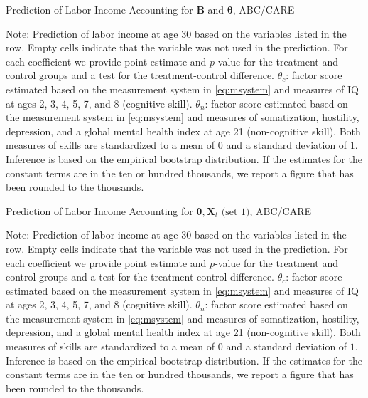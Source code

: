 \begin{table} 
\begin{threeparttable}
\caption{Prediction of Labor Income Accounting for $\bm{B}$ and $\bm{\theta}$, ABC/CARE}
\label{table:predfac1}
\centering 
\footnotesize

\begin{tablenotes}
\footnotesize
\item Note: Prediction of labor income at age 30 based on the variables listed in the row. Empty cells indicate that the variable was not used in the prediction. For each coefficient we provide point estimate and $p$-value for the treatment and control groups and a test for the treatment-control difference. $\theta_{c}$: factor score estimated based on the measurement system in \eqref{eq:msystem} and measures of IQ at ages 2, 3, 4, 5, 7, and 8 (cognitive skill). $\theta_{n}$: factor score estimated based on the measurement system in \eqref{eq:msystem} and measures of somatization, hostility, depression, and a global mental health index at age 21 (non-cognitive skill). Both measures of skills are standardized to a mean of $0$ and a standard deviation of $1$. Inference is based on the empirical bootstrap distribution. If the estimates for the constant terms are in the ten or hundred thousands, we report a figure that has been rounded to the thousands.
\end{tablenotes}
\end{threeparttable}
\end{table}

\begin{table} 
\begin{threeparttable}
\caption{Prediction of Labor Income Accounting for $\bm{\theta}, \bm{X}_{t} \text{ (set 1)}$, ABC/CARE}
\label{table:predfac2}
\centering 
\footnotesize

\begin{tablenotes}
\footnotesize
\item Note: Prediction of labor income at age 30 based on the variables listed in the row. Empty cells indicate that the variable was not used in the prediction. For each coefficient we provide point estimate and $p$-value for the treatment and control groups and a test for the treatment-control difference. $\theta_{c}$: factor score estimated based on the measurement system in \eqref{eq:msystem} and measures of IQ at ages 2, 3, 4, 5, 7, and 8 (cognitive skill). $\theta_{n}$: factor score estimated based on the measurement system in \eqref{eq:msystem} and measures of somatization, hostility, depression, and a global mental health index at age 21 (non-cognitive skill). Both measures of skills are standardized to a mean of $0$ and a standard deviation of $1$. Inference is based on the empirical bootstrap distribution. If the estimates for the constant terms are in the ten or hundred thousands, we report a figure that has been rounded to the thousands.
\end{tablenotes}
\end{threeparttable}
\end{table}


